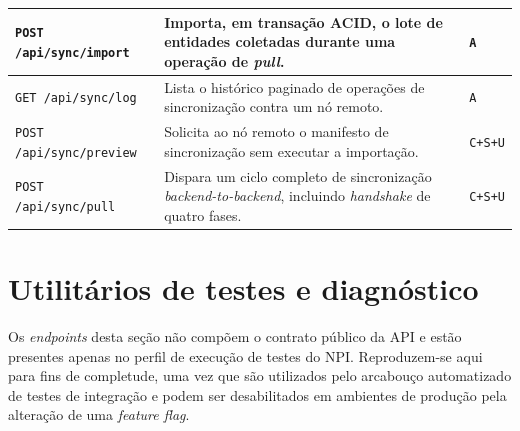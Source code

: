 \begin{longtable}{|p{}|p{}|p{}|}
\texttt{POST /api/sync/import} & Importa, em transação ACID, o lote de entidades coletadas durante uma operação de \textit{pull}. & \texttt{A} \\ \hline
\texttt{GET /api/sync/log} & Lista o histórico paginado de operações de sincronização contra um nó remoto. & \texttt{A} \\ \hline
\texttt{POST /api/sync/preview} & Solicita ao nó remoto o manifesto de sincronização sem executar a importação. & \texttt{C+S+U} \\ \hline
\texttt{POST /api/sync/pull} & Dispara um ciclo completo de sincronização \textit{backend-to-backend}, incluindo \textit{handshake} de quatro fases. & \texttt{C+S+U} \\ \hline
\end{longtable}

\section{Utilitários de testes e diagnóstico}\label{sec:apendiceaTestes}

Os \textit{endpoints} desta seção não compõem o contrato público da API e estão presentes apenas no perfil de execução de testes do NPI. Reproduzem-se aqui para fins de completude, uma vez que são utilizados pelo arcabouço automatizado de testes de integração e podem ser desabilitados em ambientes de produção pela alteração de uma \textit{feature flag}.

